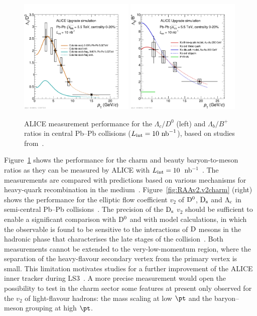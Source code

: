\begin{figure}[!t]
\centering
\includegraphics[width=0.49\textwidth]{hf/figures/ALICE_LcOverD_YR.pdf}
\includegraphics[width=0.49\textwidth]{hf/figures/ALICE_LbOverB_YR.pdf}
\caption{ALICE measurement performance for the $\Lambda_c/D^0$ (left) and $\Lambda_b/B^+$ ratios in central Pb--Pb collisions ($L_{\rm int }=10~{\rm nb}^{-1}$), based on studies from~\cite{Abelev:1625842}.}
\label{fig:HFLcLb}
\end {figure}

Figure~\ref{fig:HFLcLb} shows the performance for the charm and beauty baryon-to-meson ratios as they can be measured by ALICE with $L_{\rm int}=10$~nb$^{-1}$~\cite{Abelev:1625842}. The measurements are compared with predictions based on various mechanisms for heavy-quark recombination in the medium~\cite{Plumari:2017ntm,Oh:2009zj}.
Figure~\ref{fig:RAAv2.v2charm} (right) shows the performance for the elliptic flow coefficient $v_2$ of $\rm D^0$, $\rm D_s$ and $\rm \Lambda_c$ 
in semi-central Pb--Pb collisions~\cite{Abelev:1625842}. The precision of the $\rm D_s$ $v_2$ should be sufficient to enable a significant comparison with $\rm D^0$ and with model calculations, in which the 
observable is found to be sensitive to the interactions of $\rm D$ mesons in the hadronic phase that characterises the late stages of the collision~\cite{He:2014cla}. 
Both measurements cannot be extended to the very-low-momentum region, where the separation of the heavy-flavour secondary vertex from the primary vertex is small.  
This limitation motivates studies for a further improvement of the ALICE inner tracker during LS3~\cite{ALICEITS3}.  A more precise measurement would open the possibility to test in the charm sector some features at present only observed for the $v_2$ of light-flavour hadrons: the mass scaling at low $\pt$ and 
the baryon--meson grouping at high $\pt$.

